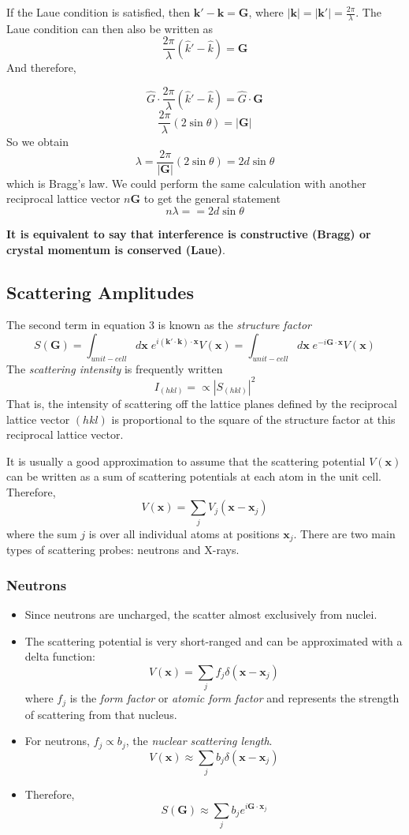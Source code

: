 \documentclass[10pt]{article}
\begin{document}
If the Laue condition is satisfied, then $\textbf{k}' - \textbf{k} = \textbf{G}$, where $|\textbf{k}| = |\textbf{k}'| = \frac{2\pi}{\lambda}$.
The Laue condition can then also be written as
$$\frac{2\pi}{\lambda}(\hat{k}' - \hat{k}) = \textbf{G}$$
And therefore,

$$\hat{G}\cdot \frac{2\pi}{\lambda}(\hat{k}' - \hat{k}) = \hat{G}\cdot\textbf{G}$$
$$\frac{2\pi}{\lambda}(2\sin\theta) = |\textbf{G}|$$
So we obtain
$$\lambda = \frac{2\pi}{|\textbf{G}|}(2\sin\theta) = 2d\sin\theta$$
which is Bragg's law. We could perform the same calculation with another reciprocal lattice vector $n\textbf{G}$ to get the general statement
$$n\lambda = = 2d\sin\theta$$

\textbf{It is equivalent to say that interference is constructive (Bragg) or crystal momentum is conserved (Laue)}.

\subsection{Scattering Amplitudes}
The second term in equation 3 is known as the \emph{structure factor}
$$
S(\textbf{G}) = \int_{unit-cell} d\textbf{x}\;e^{i(\textbf{k}'\cdot\textbf{k})\cdot\textbf{x}}V(\textbf{x}) = \int_{unit-cell} d\textbf{x}\; e^{-i\textbf{G}\cdot\textbf{x}}V(\textbf{x})
$$
The \emph{scattering intensity} is frequently written
$$I_{(hkl)} = \propto |S_{(hkl)}|^{2}$$
That is, the intensity of scattering off the lattice planes defined by the reciprocal lattice vector $(hkl)$ is proportional to the
square of the structure factor at this reciprocal lattice vector.

It is usually a good approximation to assume that the scattering potential $V(\textbf{x})$ can be written as a sum of scattering potentials
at each atom in the unit cell. Therefore,
$$
V(\textbf{x}) = \sum_{j} V_{j}(\textbf{x} - \textbf{x}_{j})
$$
where the sum $j$ is over all individual atoms at positions $\textbf{x}_{j}$. There are two main types of scattering probes: neutrons and X-rays.

\subsubsection{Neutrons}
\begin{itemize}
  \item Since neutrons are uncharged, the scatter almost exclusively from nuclei.
  \item The scattering potential is very short-ranged and can be approximated with a delta function:
  $$V(\textbf{x}) = \sum_{j} f_{j}\delta(\textbf{x} - \textbf{x}_{j})$$
  where $f_{j}$ is the \emph{form factor} or \emph{atomic form factor} and represents the strength of scattering from that nucleus.
  \item For neutrons, $f_{j} \propto b_{j}$, the \emph{nuclear scattering length}.
  $$V(\textbf{x}) \approx \sum_{j} b_{j}\delta(\textbf{x} - \textbf{x}_{j})$$
  \item Therefore,
  $$S(\textbf{G}) \approx \sum_{j} b_{j}e^{i\textbf{G}\cdot\textbf{x}_{j}}$$
\end{itemize}
\end{document}
